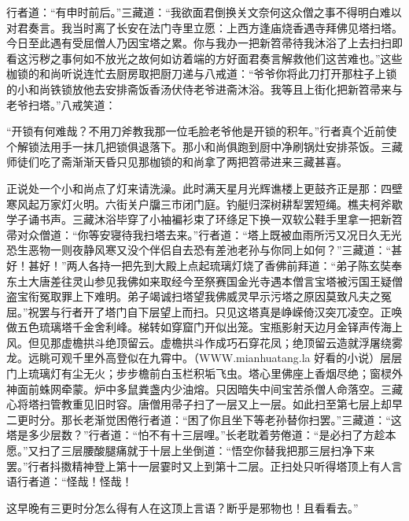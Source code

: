 \documentclass[12pt,UTF8]{ctexbook}
\begin{document}
行者道：“有申时前后。”三藏道：“我欲面君倒换关文奈何这众僧之事不得明白难以对君奏言。我当时离了长安在法门寺里立愿：上西方逢庙烧香遇寺拜佛见塔扫塔。今日至此遇有受屈僧人乃因宝塔之累。你与我办一把新笤帚待我沐浴了上去扫扫即看这污秽之事何如不放光之故何如访着端的方好面君奏言解救他们这苦难也。”这些枷锁的和尚听说连忙去厨房取把厨刀递与八戒道：“爷爷你将此刀打开那柱子上锁的小和尚铁锁放他去安排斋饭香汤伏侍老爷进斋沐浴。我等且上街化把新笤帚来与老爷扫塔。”八戒笑道：

“开锁有何难哉？不用刀斧教我那一位毛脸老爷他是开锁的积年。”行者真个近前使个解锁法用手一抹几把锁俱退落下。那小和尚俱跑到厨中净刷锅灶安排茶饭。三藏师徒们吃了斋渐渐天昏只见那枷锁的和尚拿了两把笤帚进来三藏甚喜。

正说处一个小和尚点了灯来请洗澡。此时满天星月光辉谯楼上更鼓齐正是那：四壁寒风起万家灯火明。六街关户牖三市闭门庭。钓艇归深树耕犁罢短绳。樵夫柯斧歇学子诵书声。三藏沐浴毕穿了小袖褊衫束了环绦足下换一双软公鞋手里拿一把新笤帚对众僧道：“你等安寝待我扫塔去来。”行者道：“塔上既被血雨所污又况日久无光恐生恶物一则夜静风寒又没个伴侣自去恐有差池老孙与你同上如何？”三藏道：“甚好！甚好！”两人各持一把先到大殿上点起琉璃灯烧了香佛前拜道：“弟子陈玄奘奉东土大唐差往灵山参见我佛如来取经今至祭赛国金光寺遇本僧言宝塔被污国王疑僧盗宝衔冤取罪上下难明。弟子竭诚扫塔望我佛威灵早示污塔之原因莫致凡夫之冤屈。”祝罢与行者开了塔门自下层望上而扫。只见这塔真是峥嵘倚汉突兀凌空。正唤做五色琉璃塔千金舍利峰。梯转如穿窟门开似出笼。宝瓶影射天边月金铎声传海上风。但见那虚檐拱斗绝顶留云。虚檐拱斗作成巧石穿花凤；绝顶留云造就浮屠绕雾龙。远眺可观千里外高登似在九霄中。（WWW.mianhuatang.la 好看的小说）层层门上琉璃灯有尘无火；步步檐前白玉栏积垢飞虫。塔心里佛座上香烟尽绝；窗棂外神面前蛛网牵蒙。炉中多鼠粪盏内少油熔。只因暗失中间宝苦杀僧人命落空。三藏心将塔扫管教重见旧时容。唐僧用帚子扫了一层又上一层。如此扫至第七层上却早二更时分。那长老渐觉困倦行者道：“困了你且坐下等老孙替你扫罢。”三藏道：“这塔是多少层数？”行者道：“怕不有十三层哩。”长老耽着劳倦道：“是必扫了方趁本愿。”又扫了三层腰酸腿痛就于十层上坐倒道：“悟空你替我把那三层扫净下来罢。”行者抖擞精神登上第十一层霎时又上到第十二层。正扫处只听得塔顶上有人言语行者道：“怪哉！怪哉！

这早晚有三更时分怎么得有人在这顶上言语？断乎是邪物也！且看看去。”
\end{document}
